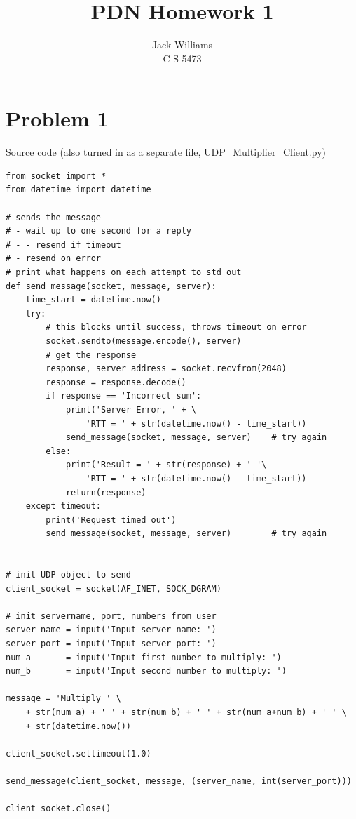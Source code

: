 \documentclass[12pt]{article}
\begin{document}
 
 
 
\title{PDN Homework 1}
\author{Jack Williams \\ C S 5473} %

\maketitle

\section*{Problem 1}

Source code (also turned in as a separate file, UDP\_Multiplier\_Client.py)

\begin{lstlisting}
from socket import *
from datetime import datetime

# sends the message
# - wait up to one second for a reply
# - - resend if timeout
# - resend on error
# print what happens on each attempt to std_out
def send_message(socket, message, server):
    time_start = datetime.now()
    try:
        # this blocks until success, throws timeout on error
        socket.sendto(message.encode(), server)
        # get the response
        response, server_address = socket.recvfrom(2048)
        response = response.decode()
        if response == 'Incorrect sum':
            print('Server Error, ' + \
                'RTT = ' + str(datetime.now() - time_start))
            send_message(socket, message, server)    # try again
        else:
            print('Result = ' + str(response) + ' '\
                'RTT = ' + str(datetime.now() - time_start))
            return(response)
    except timeout:
        print('Request timed out')
        send_message(socket, message, server)        # try again


# init UDP object to send
client_socket = socket(AF_INET, SOCK_DGRAM)

# init servername, port, numbers from user
server_name = input('Input server name: ')
server_port = input('Input server port: ')
num_a       = input('Input first number to multiply: ')
num_b       = input('Input second number to multiply: ')

message = 'Multiply ' \
    + str(num_a) + ' ' + str(num_b) + ' ' + str(num_a+num_b) + ' ' \
    + str(datetime.now())

client_socket.settimeout(1.0)

send_message(client_socket, message, (server_name, int(server_port)))

client_socket.close()
\end{lstlisting}
\end{document}
